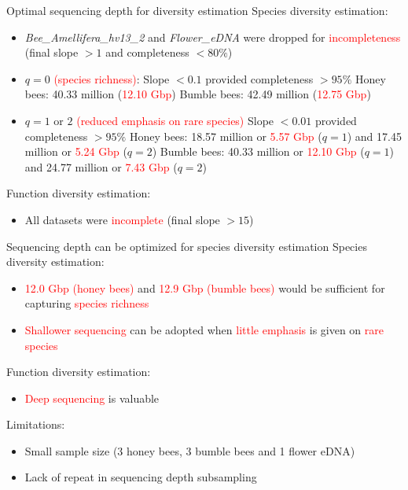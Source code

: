 \documentclass{beamer}
\begin{document}
\begin{frame}{Optimal sequencing depth for diversity estimation}
    Species diversity estimation:
    \begin{itemize}
        \item \textit{Bee\_Amellifera\_hv13\_2} and \textit{Flower\_eDNA} were dropped for \textcolor{red}{incompleteness} (final slope $> 1$ and completeness $< 80\%$)
        \item $q = 0$ \textcolor{red}{(species richness)}:
        \newline Slope $< 0.1$ provided completeness $> 95\%$
        \newline Honey bees: 40.33 million (\textcolor{red}{12.10 Gbp})
        \newline Bumble bees: 42.49 million (\textcolor{red}{12.75 Gbp})
        \item $q = 1$ or $2$ \textcolor{red}{(reduced emphasis on rare species)}
        \newline Slope $< 0.01$ provided completeness $> 95\%$
        \newline Honey bees: 18.57 million or \textcolor{red}{5.57 Gbp} ($q = 1$) and 17.45 million or \textcolor{red}{5.24 Gbp} ($q = 2$)
        \newline Bumble bees: 40.33 million or \textcolor{red}{12.10 Gbp} ($q = 1$) and 24.77 million or \textcolor{red}{7.43 Gbp} ($q = 2$)
    \end{itemize}
    Function diversity estimation:
    \begin{itemize}
        \item All datasets were \textcolor{red}{incomplete} (final slope $> 15$)
    \end{itemize}
    
\end{frame}

\begin{frame}{Sequencing depth can be optimized for species diversity estimation}
    Species diversity estimation:
    \begin{itemize}
        \item \textcolor{red}{12.0 Gbp (honey bees)} and \textcolor{red}{12.9 Gbp (bumble bees)} would be sufficient for capturing \textcolor{red}{species richness}
        \item \textcolor{red}{Shallower sequencing} can be adopted when \textcolor{red}{little emphasis} is given on \textcolor{red}{rare species}
    \end{itemize}
    Function diversity estimation:
    \begin{itemize}
        \item \textcolor{red}{Deep sequencing} is valuable
    \end{itemize}
    Limitations:
    \begin{itemize}
        \item Small sample size (3 honey bees, 3 bumble bees and 1 flower eDNA)
        \item Lack of repeat in sequencing depth subsampling
    \end{itemize}
\end{frame}
\end{document}
